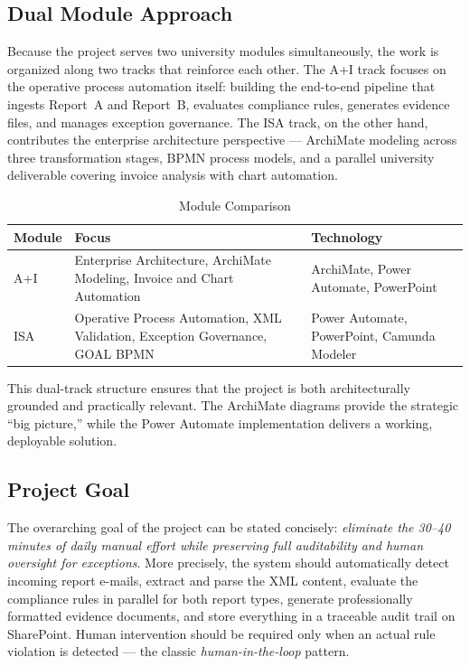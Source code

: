 \documentclass[11pt,a4paper]{article}
\begin{document}
\subsection{Dual Module Approach}

Because the project serves two university modules simultaneously, the work is organized along two tracks that reinforce each other. The A+I track focuses on the operative process automation itself: building the end-to-end pipeline that ingests Report~A and Report~B, evaluates compliance rules, generates evidence files, and manages exception governance. The ISA track, on the other hand, contributes the enterprise architecture perspective --- ArchiMate modeling across three transformation stages, BPMN process models, and a parallel university deliverable covering invoice analysis with chart automation.

\begin{table}[ht]
\centering
\caption{Module Comparison}
\begin{tabular}{@{}p{}p{}p{}@{}}
\toprule
\textbf{Module} & \textbf{Focus} & \textbf{Technology} \\
\midrule
A+I & Enterprise Architecture, ArchiMate Modeling, Invoice and Chart Automation & ArchiMate, Power Automate, PowerPoint \\
ISA & Operative Process Automation, XML Validation, Exception Governance, GOAL BPMN & Power Automate, PowerPoint, Camunda Modeler \\
\bottomrule
\end{tabular}
\end{table}

This dual-track structure ensures that the project is both architecturally grounded and practically relevant. The ArchiMate diagrams provide the strategic ``big picture,'' while the Power Automate implementation delivers a working, deployable solution.

\subsection{Project Goal}

The overarching goal of the project can be stated concisely: \emph{eliminate the 30--40 minutes of daily manual effort while preserving full auditability and human oversight for exceptions}. More precisely, the system should automatically detect incoming report e-mails, extract and parse the XML content, evaluate the compliance rules in parallel for both report types, generate professionally formatted evidence documents, and store everything in a traceable audit trail on SharePoint. Human intervention should be required only when an actual rule violation is detected --- the classic \emph{human-in-the-loop} pattern.
\end{document}

